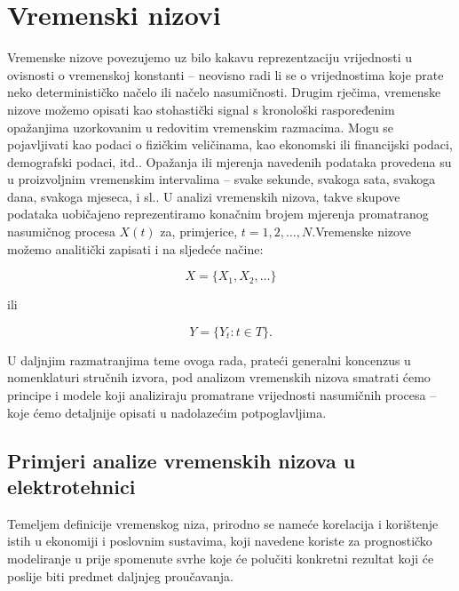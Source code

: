 \documentclass[a4paper,12pt,oneside]{memoir}
\begin{document}


        \section{Vremenski nizovi}

            Vremenske nizove povezujemo uz bilo kakavu reprezentzaciju vrijednosti u ovisnosti o vremenskoj konstanti -- neovisno radi li se o vrijednostima koje prate neko determinističko načelo ili načelo nasumičnosti. Drugim rječima, vremenske nizove možemo opisati kao stohastički signal s kronološki raspoređenim opažanjima uzorkovanim u redovitim vremenskim razmacima. Mogu se pojavljivati kao podaci o fizičkim veličinama, kao ekonomski ili financijski podaci, demografski podaci, itd.. Opažanja ili mjerenja navedenih podataka provedena su u proizvoljnim vremenskim intervalima -- svake sekunde, svakoga sata, svakoga dana, svakoga mjeseca, i sl.. U analizi vremenskih nizova, takve skupove podataka uobičajeno reprezentiramo konačnim brojem mjerenja promatranog nasumičnog procesa $X(t)$ za, primjerice, $t=1,2,\ldots,N$.\cite{Priestley}Vremenske nizove možemo analitički zapisati i na sljedeće načine:

            \begin{equation}
                X=\{X_1,X_2,\ldots\}
            \end{equation}

            ili

            \begin{equation}
                Y=\{Y_t: t\in T\}.
            \end{equation}
            
            U daljnjim razmatranjima teme ovoga rada, prateći generalni koncenzus u nomenklaturi stručnih izvora, pod analizom vremenskih nizova smatrati ćemo principe i modele koji analiziraju promatrane vrijednosti nasumičnih procesa -- koje ćemo detaljnije opisati u nadolazećim potpoglavljima.

        \subsection{Primjeri analize vremenskih nizova u elektrotehnici}
            Temeljem definicije vremenskog niza, prirodno se nameće korelacija i korištenje istih u ekonomiji i poslovnim sustavima, koji navedene koriste za prognostičko modeliranje u prije spomenute svrhe koje će polučiti konkretni rezultat koji će poslije biti predmet daljnjeg proučavanja.
\end{document}
